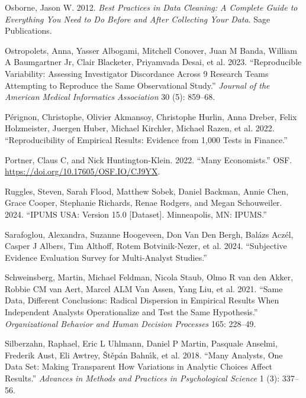 \documentclass[
  letterpaper,
  DIV=11,
  numbers=noendperiod]{scrartcl}
\newlength{\cslhangindent}
\newlength{\cslentryspacingunit} %
\newenvironment{CSLReferences}[2] %
 {%
  \setlength{\parindent}{0pt}
  \ifodd #1
  \let\oldpar\par
  \def\par{\hangindent=\cslhangindent\oldpar}
  \fi
  \setlength{\parskip}{#2\cslentryspacingunit}
 }%
 {}
\begin{document}
\begin{CSLReferences}{1}{0}
\leavevmode{}%
Osborne, Jason W. 2012. \emph{Best Practices in Data Cleaning: A
Complete Guide to Everything You Need to Do Before and After Collecting
Your Data}. Sage Publications.

\leavevmode{}%
Ostropolets, Anna, Yasser Albogami, Mitchell Conover, Juan M Banda,
William A Baumgartner Jr, Clair Blacketer, Priyamvada Desai, et al.
2023. {``Reproducible Variability: Assessing Investigator Discordance
Across 9 Research Teams Attempting to Reproduce the Same Observational
Study.''} \emph{Journal of the American Medical Informatics Association}
30 (5): 859--68.

\leavevmode{}%
Pérignon, Christophe, Olivier Akmansoy, Christophe Hurlin, Anna Dreber,
Felix Holzmeister, Juergen Huber, Michael Kirchler, Michael Razen, et
al. 2022. {``Reproducibility of Empirical Results: Evidence from 1,000
Tests in Finance.''}

\leavevmode{}%
Portner, Claus C, and Nick Huntington-Klein. 2022. {``Many
Economists.''} OSF. \url{https://doi.org/10.17605/OSF.IO/CJ9YX}.

\leavevmode{}%
Ruggles, Steven, Sarah Flood, Matthew Sobek, Daniel Backman, Annie Chen,
Grace Cooper, Stephanie Richards, Renae Rodgers, and Megan Schouweiler.
2024. {``IPUMS USA: Version 15.0 {[}Dataset{]}. Minneapolis, MN:
IPUMS.''}

\leavevmode{}%
Sarafoglou, Alexandra, Suzanne Hoogeveen, Don Van Den Bergh, Balázs
Aczél, Casper J Albers, Tim Althoff, Rotem Botvinik-Nezer, et al. 2024.
{``Subjective Evidence Evaluation Survey for Multi-Analyst Studies.''}

\leavevmode{}%
Schweinsberg, Martin, Michael Feldman, Nicola Staub, Olmo R van den
Akker, Robbie CM van Aert, Marcel ALM Van Assen, Yang Liu, et al. 2021.
{``Same Data, Different Conclusions: Radical Dispersion in Empirical
Results When Independent Analysts Operationalize and Test the Same
Hypothesis.''} \emph{Organizational Behavior and Human Decision
Processes} 165: 228--49.

\leavevmode{}%
Silberzahn, Raphael, Eric L Uhlmann, Daniel P Martin, Pasquale Anselmi,
Frederik Aust, Eli Awtrey, Štěpán Bahnı́k, et al. 2018. {``Many Analysts,
One Data Set: Making Transparent How Variations in Analytic Choices
Affect Results.''} \emph{Advances in Methods and Practices in
Psychological Science} 1 (3): 337--56.


\end{CSLReferences}
\end{document}

